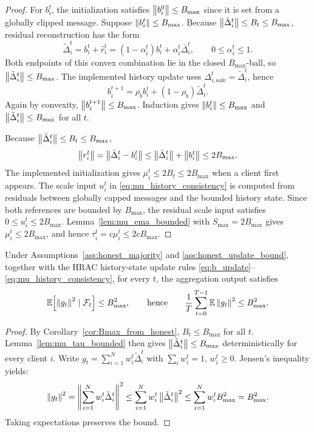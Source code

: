 \begin{proof}
For \(b_i^t\), the initialization satisfies
\(\left\lVert b_i^0 \right\rVert\le B_{\max}\) since it is set from a globally clipped
message. Suppose \(\left\lVert b_i^t \right\rVert\le B_{\max}\). Because
\(\left\lVert \bar\Delta_i^t \right\rVert\le B_t\le B_{\max}\), residual reconstruction has the
form
\[
    \tilde\Delta_i^t
    =
    b_i^t+\hat r_i^t
    =
    (1-\alpha_i^t)b_i^t+\alpha_i^t\bar\Delta_i^t,
    \qquad
    0\le\alpha_i^t\le1 .
\]
Both endpoints of this convex combination lie in the closed
\(B_{\max}\)-ball, so
\(\left\lVert \tilde\Delta_i^t \right\rVert\le B_{\max}\). The implemented history update uses
\(\Delta_{i,\mathrm{safe}}^t=\tilde\Delta_i^t\), hence
\[
    b_i^{t+1}
    =
    \rho_b b_i^t+(1-\rho_b)\tilde\Delta_i^t .
\]
Again by convexity, \(\left\lVert b_i^{t+1} \right\rVert\le B_{\max}\). Induction gives
\(\left\lVert b_i^t \right\rVert\le B_{\max}\) and \(\left\lVert \tilde\Delta_i^t \right\rVert\le B_{\max}\) for
all \(t\).

Because \(\left\lVert \bar\Delta_i^t \right\rVert\le B_t\le B_{\max}\),
\[
    \left\lVert r_i^t \right\rVert
    =
    \left\lVert \bar\Delta_i^t-b_i^t \right\rVert
    \le
    \left\lVert \bar\Delta_i^t \right\rVert+\left\lVert b_i^t \right\rVert
    \le
    2B_{\max}.
\]
The implemented initialization gives
\(\mu_i^t\le2B_t\le2B_{\max}\) when a client first appears. The scale input
\(u_i^t\) in
\eqref{eq:mu_history_consistency} is computed from residuals between globally
capped messages and the bounded history state. Since both references are
bounded by \(B_{\max}\), the residual scale input satisfies
\(0\le u_i^t\le2B_{\max}\). Lemma~\ref{lem:mu_ema_bounded} with
\(S_{\max}=2B_{\max}\) gives \(\mu_i^t\le2B_{\max}\), and hence
\(\tau_i^t=c\mu_i^t\le2cB_{\max}\).
\end{proof}

\begin{lemma}
\label{lem:g_second_derived}
Under Assumptions~\ref{ass:honest_majority} and
\ref{ass:honest_update_bound}, together with the HRAC history-state update
rules \eqref{eq:b_update}--\eqref{eq:mu_history_consistency}, for every \(t\),
the aggregation output satisfies
\begin{equation}
    \mathbb{E}\!\left[\left\lVert g_t \right\rVert^2 \mid \mathcal{F}_t\right]
    \le
    B_{\max}^2,
    \qquad\text{hence}\qquad
    \frac{1}{T}\sum_{t=0}^{T-1}\mathbb{E}\left\lVert g_t \right\rVert^2 \le B_{\max}^2.
    \label{eq:Gg_derived}
\end{equation}
\end{lemma}

\begin{proof}
By Corollary~\ref{cor:Bmax_from_honest}, \(B_t\le B_{\max}\) for all \(t\). 
Lemma~\ref{lem:mu_tau_bounded} then gives
\(\left\lVert \tilde\Delta_i^t \right\rVert\le B_{\max}\) deterministically for every
client \(i\).
Write \(g_t=\sum_{i=1}^N w_i^t \tilde{\Delta}_i^t\) with \(\sum_i w_i^t=1\),
\(w_i^t\ge 0\). Jensen's inequality yields:
\[
    \left\lVert g_t \right\rVert^2 = \left\lVert \sum_{i=1}^N w_i^t \tilde{\Delta}_i^t \right\rVert^2
    \le
    \sum_{i=1}^N w_i^t \left\lVert \tilde{\Delta}_i^t \right\rVert^2
    \le
    \sum_{i=1}^N w_i^t B_{\max}^2 = B_{\max}^2.
\]
Taking expectations preserves the bound.
\end{proof}

